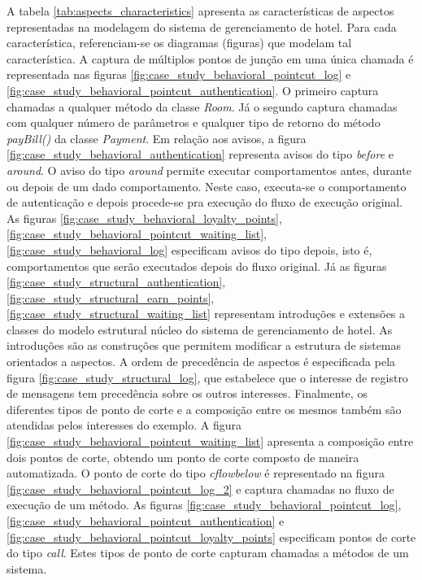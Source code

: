 A tabela \ref{tab:aspects_characteristics} apresenta as características de aspectos representadas na modelagem do sistema de
gerenciamento de hotel. Para cada característica, referenciam-se os diagramas (figuras) que modelam tal característica. A captura de múltiplos pontos
de junção em uma única chamada é representada nas figuras \ref{fig:case_study_behavioral_pointcut_log}
e \ref{fig:case_study_behavioral_pointcut_authentication}. O primeiro captura chamadas a qualquer método da classe \textit{Room}. Já o
segundo captura chamadas com qualquer número de parâmetros e qualquer tipo de retorno do método \textit{payBill()} da classe \textit{Payment}. Em relação aos avisos,
a figura \ref{fig:case_study_behavioral_authentication} representa avisos do tipo \textit{before} e \textit{around}. O aviso do tipo \textit{around}
permite executar comportamentos antes, durante ou depois de um dado comportamento. Neste caso, executa-se o comportamento de autenticação e depois
procede-se pra execução do fluxo de execução original. As figuras \ref{fig:case_study_behavioral_loyalty_points},
\ref{fig:case_study_behavioral_pointcut_waiting_list}, \ref{fig:case_study_behavioral_log} especificam avisos do tipo depois, isto é,
comportamentos que serão executados depois do fluxo original. Já as figuras \ref{fig:case_study_structural_authentication},
\ref{fig:case_study_structural_earn_points}, \ref{fig:case_study_structural_waiting_list} representam introduções e extensões a classes do modelo
estrutural núcleo do sistema de gerenciamento de hotel. As introduções são as construções que permitem modificar a estrutura de sistemas orientados a
aspectos. A ordem de precedência de aspectos é especificada pela figura \ref{fig:case_study_structural_log}, que estabelece que o interesse de
registro de mensagens tem precedência sobre os outros interesses. Finalmente, os diferentes tipos de ponto de corte e a composição entre os mesmos
também são atendidas pelos interesses do exemplo. A figura \ref{fig:case_study_behavioral_pointcut_waiting_list} apresenta a composição entre dois pontos de
corte, obtendo um ponto de corte composto de maneira automatizada. O ponto de corte do tipo \textit{cflowbelow} é representado na figura
\ref{fig:case_study_behavioral_pointcut_log_2} e captura chamadas no fluxo de execução de um método. As figuras
\ref{fig:case_study_behavioral_pointcut_log}, \ref{fig:case_study_behavioral_pointcut_authentication} e
\ref{fig:case_study_behavioral_pointcut_loyalty_points} especificam pontos de corte do tipo \textit{call}. Estes tipos de ponto de corte capturam
chamadas a métodos de um sistema.

